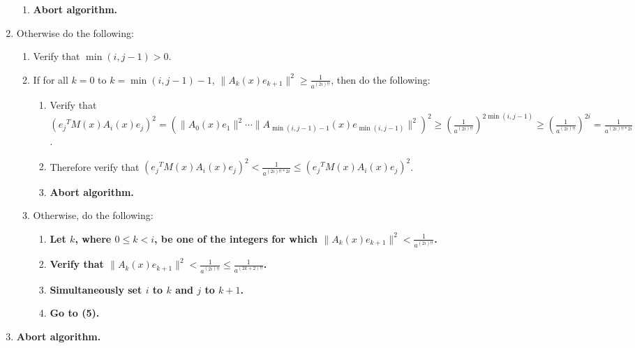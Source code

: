 \documentclass[twocolumn]{article}
\begin{document}
\begin{enumerate}
\begin{enumerate}
					\item \textbf{Abort algorithm.}
				\end{enumerate}
				\item Otherwise do the following:
				\begin{enumerate}
					\item Verify that $\min(i,j-1)>0$.
					\item If for all $k=0$ to $k=\min(i,j-1)-1$, $\lVert A_k(x)e_{k+1}\rVert^2\ge\frac{1}{a^{(2i)!!}}$, then do the following:
					\begin{enumerate}
						\item Verify that $({e_j}^TM(x)A_i(x)e_j)^2=(\lVert A_0(x)e_1\rVert^2\cdots\allowbreak\lVert A_{\min(i,j-1)-1}(x)e_{\min(i,j-1)}\rVert^2)^2\ge(\frac{1}{a^{(2i)!!}})^{2\min(i,j-1)}\ge(\frac{1}{a^{(2i)!!}})^{2i}=\frac{1}{a^{(2i)!!*2i}}$.
						\item Therefore verify that $({e_j}^TM(x)A_i(x)e_j)^2<\frac{1}{a^{(2i)!!*2i}}\le ({e_j}^TM(x)A_i(x)e_j)^2$.
						\item \textbf{Abort algorithm.}
					\end{enumerate}
					\item Otherwise, do the following:
					\begin{enumerate}
						\item \textbf{Let $k$, where $0\le k<i$, be one of the integers for which $\lVert A_k(x)e_{k+1}\rVert^2<\frac{1}{a^{(2i)!!}}$.}
						\item \textbf{Verify that $\lVert A_k(x)e_{k+1}\rVert^2<\frac{1}{a^{(2i)!!}}\le\frac{1}{a^{(2k+2)!!}}$.}
						\item \textbf{Simultaneously set $i$ to $k$ and $j$ to $k+1$.}
						\item \textbf{Go to (5).}
					\end{enumerate}
				\end{enumerate}
				\item \textbf{Abort algorithm.}
			\end{enumerate}
\end{document}
